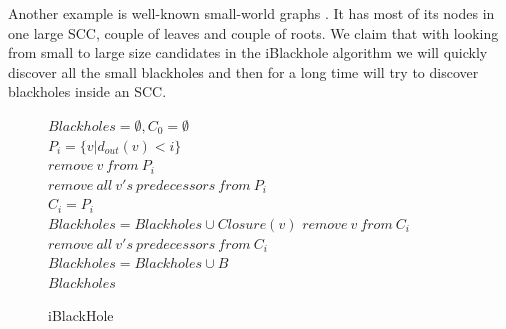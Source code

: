 \documentclass{svproc}
\begin{document}
Another example is well-known small-world graphs \cite{watts1999networks}. It has most of its nodes in one large SCC, couple of leaves and couple of roots.
We claim that with looking from small to large size candidates in the iBlackhole algorithm we will quickly discover all the small blackholes and then for a long time will try to discover blackholes inside an SCC.

\begin{figure}[H]
	\begin{center}
		\begin{algorithm}[H]
			\SetAlgoLined

                        $Blackholes = \emptyset, C_0 = \emptyset$ \\
                         {
                            $P_i = \{v | d_{out}(v) < i\}$  
                             \\
                             {
                                 {
                                     {
                                        $remove\ v\ from\ P_i$\\
                                        $remove\ all\ v's\ predecessors\ from\ P_i$\\
                                    }
                                }
                            }
                        }
                        $C_i = P_i$   \\
                         {
                             {
                                $Blackholes = Blackholes \cup Closure(v)$
                            }
                             {
                                $remove\ v\ from\ C_i$ \\
                                $remove\ all\ v's\ predecessors\ from\ C_i$ \\
                            }
                        }
                         {
                             {
                                 {
                                    $Blackholes = Blackholes \cup B$ \\
                                }
                            }
                        }
                        \Return $Blackholes$
			\label{alg:iblackhole}
			\caption{iBlackHole}
		\end{algorithm}
	\end{center}
\end{figure}
\end{document}
